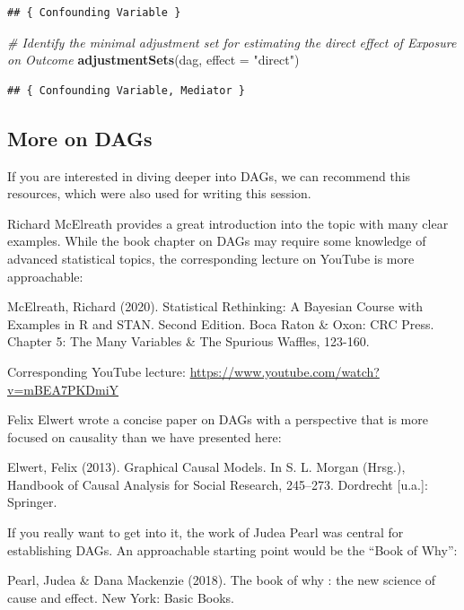 \documentclass[
]{book}
\newenvironment{Shaded}{\begin{snugshade}}{\end{snugshade}}
\newcommand{\AttributeTok}[1]{\textcolor[rgb]{0.13,0.29,0.53}{#1}}
\newcommand{\CommentTok}[1]{\textcolor[rgb]{0.56,0.35,0.01}{\textit{#1}}}
\newcommand{\FunctionTok}[1]{\textcolor[rgb]{0.13,0.29,0.53}{\textbf{#1}}}
\newcommand{\NormalTok}[1]{#1}
\newcommand{\StringTok}[1]{\textcolor[rgb]{0.31,0.60,0.02}{#1}}
\begin{document}
\begin{verbatim}
## { Confounding Variable }
\end{verbatim}

\begin{Shaded}
\begin{Highlighting}[]
\CommentTok{\# Identify the minimal adjustment set for estimating the direct effect of Exposure on Outcome}
\FunctionTok{adjustmentSets}\NormalTok{(dag, }\AttributeTok{effect =} \StringTok{"direct"}\NormalTok{)}
\end{Highlighting}
\end{Shaded}

\begin{verbatim}
## { Confounding Variable, Mediator }
\end{verbatim}

\hypertarget{more-on-dags}{%
\subsection{More on DAGs}\label{more-on-dags}}

If you are interested in diving deeper into DAGs, we can recommend this
resources, which were also used for writing this session.

Richard McElreath provides a great introduction into the topic with many clear
examples. While the book chapter on DAGs may require some knowledge of advanced
statistical topics, the corresponding lecture on YouTube is more approachable:

McElreath, Richard (2020). Statistical Rethinking: A Bayesian Course with
Examples in R and STAN. Second Edition. Boca Raton \& Oxon: CRC Press.
Chapter 5: The Many Variables \& The Spurious Waffles, 123-160.

Corresponding YouTube lecture: \url{https://www.youtube.com/watch?v=mBEA7PKDmiY}

Felix Elwert wrote a concise paper on DAGs with a perspective that is more
focused on causality than we have presented here:

Elwert, Felix (2013). Graphical Causal Models. In S. L. Morgan (Hrsg.), Handbook
of Causal Analysis for Social Research, 245--273. Dordrecht {[}u.a.{]}: Springer.

If you really want to get into it, the work of Judea Pearl was central for
establishing DAGs. An approachable starting point would be the ``Book of Why'':

Pearl, Judea \& Dana Mackenzie (2018). The book of why : the new science of cause
and effect. New York: Basic Books.
\end{document}
